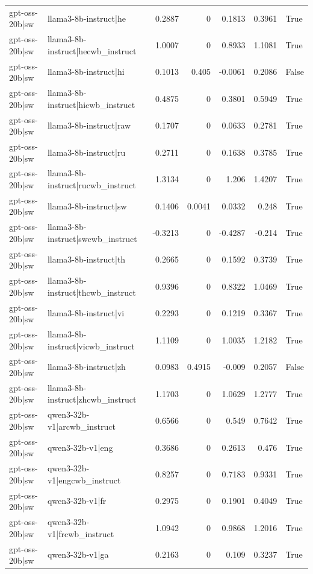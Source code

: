 \begin{table}
\begin{tabular}{l l r r r r l}
gpt-oss-20b|sw & llama3-8b-instruct|he & 0.2887 & 0 & 0.1813 & 0.3961 & True \\
gpt-oss-20b|sw & llama3-8b-instruct|hecwb_instruct & 1.0007 & 0 & 0.8933 & 1.1081 & True \\
gpt-oss-20b|sw & llama3-8b-instruct|hi & 0.1013 & 0.405 & -0.0061 & 0.2086 & False \\
gpt-oss-20b|sw & llama3-8b-instruct|hicwb_instruct & 0.4875 & 0 & 0.3801 & 0.5949 & True \\
gpt-oss-20b|sw & llama3-8b-instruct|raw & 0.1707 & 0 & 0.0633 & 0.2781 & True \\
gpt-oss-20b|sw & llama3-8b-instruct|ru & 0.2711 & 0 & 0.1638 & 0.3785 & True \\
gpt-oss-20b|sw & llama3-8b-instruct|rucwb_instruct & 1.3134 & 0 & 1.206 & 1.4207 & True \\
gpt-oss-20b|sw & llama3-8b-instruct|sw & 0.1406 & 0.0041 & 0.0332 & 0.248 & True \\
gpt-oss-20b|sw & llama3-8b-instruct|swcwb_instruct & -0.3213 & 0 & -0.4287 & -0.214 & True \\
gpt-oss-20b|sw & llama3-8b-instruct|th & 0.2665 & 0 & 0.1592 & 0.3739 & True \\
gpt-oss-20b|sw & llama3-8b-instruct|thcwb_instruct & 0.9396 & 0 & 0.8322 & 1.0469 & True \\
gpt-oss-20b|sw & llama3-8b-instruct|vi & 0.2293 & 0 & 0.1219 & 0.3367 & True \\
gpt-oss-20b|sw & llama3-8b-instruct|vicwb_instruct & 1.1109 & 0 & 1.0035 & 1.2182 & True \\
gpt-oss-20b|sw & llama3-8b-instruct|zh & 0.0983 & 0.4915 & -0.009 & 0.2057 & False \\
gpt-oss-20b|sw & llama3-8b-instruct|zhcwb_instruct & 1.1703 & 0 & 1.0629 & 1.2777 & True \\
gpt-oss-20b|sw & qwen3-32b-v1|arcwb_instruct & 0.6566 & 0 & 0.549 & 0.7642 & True \\
gpt-oss-20b|sw & qwen3-32b-v1|eng & 0.3686 & 0 & 0.2613 & 0.476 & True \\
gpt-oss-20b|sw & qwen3-32b-v1|engcwb_instruct & 0.8257 & 0 & 0.7183 & 0.9331 & True \\
gpt-oss-20b|sw & qwen3-32b-v1|fr & 0.2975 & 0 & 0.1901 & 0.4049 & True \\
gpt-oss-20b|sw & qwen3-32b-v1|frcwb_instruct & 1.0942 & 0 & 0.9868 & 1.2016 & True \\
gpt-oss-20b|sw & qwen3-32b-v1|ga & 0.2163 & 0 & 0.109 & 0.3237 & True \\

\end{tabular}
\end{table}
